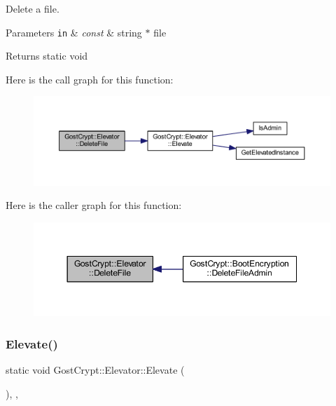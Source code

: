 Delete a file. 


\begin{DoxyParams}[1]{Parameters}
\mbox{\tt in}  & {\em const} & string $\ast$ file \\
\hline
\end{DoxyParams}
\begin{DoxyReturn}{Returns}
static void 
\end{DoxyReturn}
Here is the call graph for this function\+:
\nopagebreak
\begin{figure}[H]
\begin{center}
\leavevmode
\includegraphics[width=350pt]{class_gost_crypt_1_1_elevator_a7436d3b36f4775314d51ea0cc3ec13f3_cgraph}
\end{center}
\end{figure}
Here is the caller graph for this function\+:
\nopagebreak
\begin{figure}[H]
\begin{center}
\leavevmode
\includegraphics[width=350pt]{class_gost_crypt_1_1_elevator_a7436d3b36f4775314d51ea0cc3ec13f3_icgraph}
\end{center}
\end{figure}
\mbox{\label{class_gost_crypt_1_1_elevator_a0b5a981fa1fa7f2b93f39c55a5ba20e1}} 
\subsubsection{\texorpdfstring{Elevate()}{Elevate()}}
{\footnotesize\ttfamily static void Gost\+Crypt\+::\+Elevator\+::\+Elevate (\begin{DoxyParamCaption}{ }\end{DoxyParamCaption})\hspace{0.3cm}{\ttfamily [inline]}, {\ttfamily [static]}, {\ttfamily [protected]}}



